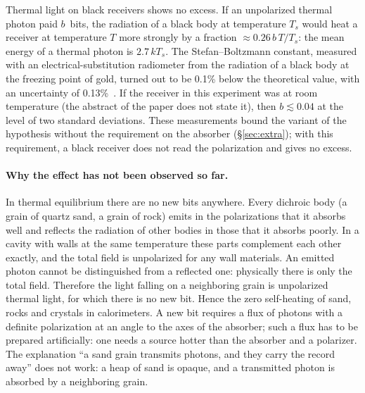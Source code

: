 \documentclass[11pt,a4paper]{article}
\newcommand{\Sref}[1]{\hyperref[#1]{\S\ref{#1}}}
\begin{document}
Thermal light on black receivers shows no excess. If an unpolarized thermal photon paid $b$~bits, the radiation of a black body at temperature $T_s$ would heat a receiver at temperature $T$ more strongly by a fraction $\approx 0.26\,b\,T/T_s$: the mean energy of a thermal photon is $2.7\,kT_s$. The Stefan--Boltzmann constant, measured with an electrical-substitution radiometer from the radiation of a black body at the freezing point of gold, turned out to be 0.1\% below the theoretical value, with an uncertainty of 0.13\%~\cite{blevin1971}. If the receiver in this experiment was at room temperature (the abstract of the paper does not state it), then $b\lesssim 0.04$ at the level of two standard deviations. These measurements bound the variant of the hypothesis without the requirement on the absorber (\Sref{sec:extra}); with this requirement, a black receiver does not read the polarization and gives no excess.

\paragraph{Why the effect has not been observed so far.}
In thermal equilibrium there are no new bits anywhere. Every dichroic body (a grain of quartz sand, a grain of rock) emits in the polarizations that it absorbs well and reflects the radiation of other bodies in those that it absorbs poorly. In a cavity with walls at the same temperature these parts complement each other exactly, and the total field is unpolarized for any wall materials. An emitted photon cannot be distinguished from a reflected one: physically there is only the total field. Therefore the light falling on a neighboring grain is unpolarized thermal light, for which there is no new bit. Hence the zero self-heating of sand, rocks and crystals in calorimeters. A new bit requires a flux of photons with a definite polarization at an angle to the axes of the absorber; such a flux has to be prepared artificially: one needs a source hotter than the absorber and a polarizer. The explanation ``a sand grain transmits photons, and they carry the record away'' does not work: a heap of sand is opaque, and a transmitted photon is absorbed by a neighboring grain.
\end{document}
